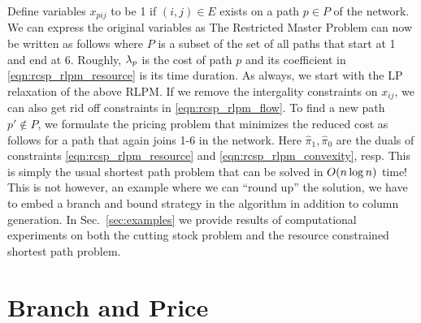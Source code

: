 \documentclass[letterpaper, 10pt, twocolumn, reqno]{amsart}
\begin{document}
Define variables $x_{pij}$ to be 1 if $(i,j) \in E$ exists on a path $p \in P$ of the network. We can express the original variables as
The Restricted Master Problem can now be written as follows
where $P$ is a subset of the set of all paths that start at 1 and end at 6.
Roughly, $\lambda_p$ is the cost of path $p$ and its coefficient in \eqref{eqn:rcsp_rlpm_resource} is its time duration. As always, we start with the LP
relaxation of the above RLPM. If we remove the intergality constraints on $x_{ij}$, we can also get rid off constraints in \eqref{eqn:rcsp_rlpm_flow}. To find a new path $p' \notin P$, we formulate the pricing problem that minimizes the reduced cost as follows
for a path that again joins 1-6 in the network. Here $\hat{\pi}_1, \hat{\pi}_0$ are the duals of constraints \eqref{eqn:rcsp_rlpm_resource} and \eqref{eqn:rcsp_rlpm_convexity}, resp. This is simply the usual shortest path problem that can be solved in $O(n \log n)$ time! This is not however, an example where we can ``round up'' the solution, we have to embed a branch and bound strategy in the algorithm in addition to column generation. In Sec.~\ref{sec:examples} we provide results of computational experiments on both the cutting stock problem and the resource constrained shortest path problem.

\section{Branch and Price}
\label{sec:branch_and_price}
\end{document}
